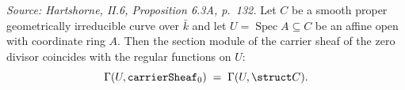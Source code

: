 \begin{lemma}
  \label{lem:carrierSheaf_zero_sections_eq_structureSheaf}
  \textit{Source: Hartshorne, II.6, Proposition 6.3A, p.~132.}
  Let \(C\) be a smooth proper geometrically irreducible curve over \(\bar k\)
  and let \(U = \operatorname{Spec} A \subseteq C\) be an affine open with
  coordinate ring \(A\). Then the section module of the carrier sheaf of the
  zero divisor coincides with the regular functions on \(U\):
  \[
    \Gamma(U, \texttt{carrierSheaf}_0) \;=\; \Gamma(U, \struct C).
  \]
\end{lemma}

